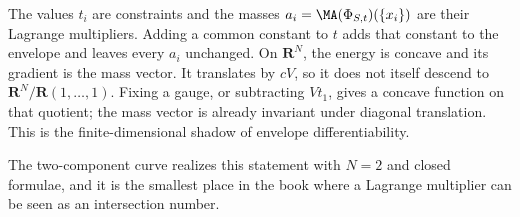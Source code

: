 \begin{example}
\label{ex:ch31-lagrange}
The values $t_i$ are constraints and the masses
$a_i=\MA(\Phi_{S,t})(\{x_i\})$ are their Lagrange multipliers.  Adding a
common constant to $t$ adds that constant to the envelope and leaves every
$a_i$ unchanged.  On $\mathbf R^N$, the energy is concave and its
gradient is the mass vector.  It translates by $cV$, so it does not itself
descend to $\mathbf R^N/\mathbf R(1,\ldots,1)$.  Fixing a gauge, or
subtracting $Vt_1$, gives a concave function on that quotient; the mass
vector is already invariant under diagonal translation.  This is the
finite-dimensional shadow of envelope differentiability.
\end{example}

The two-component curve realizes this statement with $N=2$ and closed
formulae, and it is the smallest place in the book where a Lagrange
multiplier can be seen as an intersection number.

